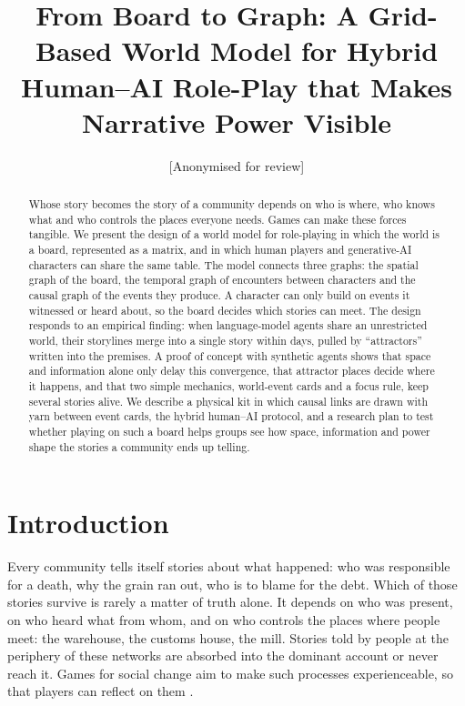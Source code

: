 \documentclass[11pt]{article}
\title{\textbf{From Board to Graph: A Grid-Based World Model for Hybrid Human--AI Role-Play that Makes Narrative Power Visible}}
\author{[Anonymised for review]}
\date{}
\begin{document}
\maketitle

\begin{abstract}
\noindent
Whose story becomes the story of a community depends on who is where, who
knows what and who controls the places everyone needs. Games can make these
forces tangible. We present the design of a world model for role-playing in
which the world is a board, represented as a matrix, and in which human
players and generative-AI characters can share the same table. The model
connects three graphs: the spatial graph of the board, the temporal graph of
encounters between characters and the causal graph of the events they
produce. A character can only build on events it witnessed or heard about,
so the board decides which stories can meet. The design responds to an
empirical finding: when language-model agents share an unrestricted world,
their storylines merge into a single story within days, pulled by
\enquote{attractors} written into the premises. A proof of concept with
synthetic agents shows that space and information alone only delay this
convergence, that attractor places decide where it happens, and that two
simple mechanics, world-event cards and a focus rule, keep several stories
alive. We describe a physical kit in which causal links are drawn with yarn
between event cards, the hybrid human--AI protocol, and a research plan to
test whether playing on such a board helps groups see how space, information
and power shape the stories a community ends up telling.
\end{abstract}

\section{Introduction}

Every community tells itself stories about what happened: who was
responsible for a death, why the grain ran out, who is to blame for the debt.
Which of those stories survive is rarely a matter of truth alone. It depends
on who was present, on who heard what from whom, and on who controls the
places where people meet: the warehouse, the customs house, the mill.
Stories told by people at the periphery of these networks are absorbed into
the dominant account or never reach it. Games for social change aim to make
such processes experienceable, so that players can reflect on them
\parencite{flanagan2009,flanagan2014,bogost2007}.
\end{document}
